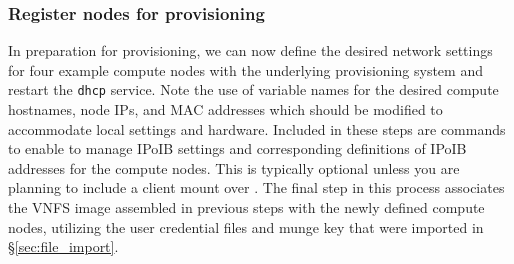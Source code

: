 \subsubsection{Register nodes for provisioning}

In preparation for provisioning, we can now define the desired network settings
for four example compute nodes with the underlying provisioning system and
restart the \texttt{dhcp} service. Note the use of variable names for the
desired compute hostnames, node IPs, and MAC addresses which should be modified to
accommodate local settings and hardware. Included in these steps are commands
to enable \Warewulf{} to manage IPoIB settings and corresponding definitions of
IPoIB addresses for the compute nodes. This is typically optional unless you
are planning to include a \Lustre{} client mount over \InfiniBand{}.  The final step
in this process associates the VNFS image assembled in previous steps with the
newly defined compute nodes, utilizing the user credential files and munge key
that were imported in \S\ref{sec:file_import}.


